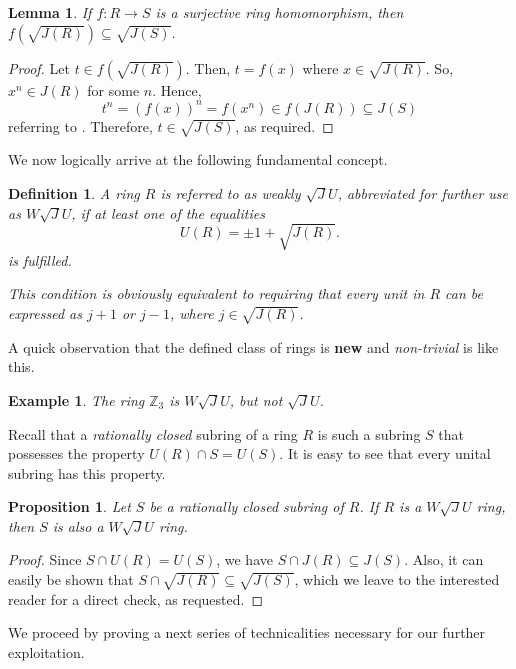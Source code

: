 \documentclass[12pt]{amsart}
\newtheorem{proposition}[theorem]{Proposition} \newtheorem{lemma}[theorem]{Lemma}
\newtheorem{example}[theorem]{Example} \newtheorem{definition}[theorem]{Definition}
\begin{document}
\begin{lemma}\label{2.1} If \(f: R \rightarrow S\) is a surjective ring homomorphism, then $f(\sqrt{J(R)})
\subseteq \sqrt{J(S)}$.
\end{lemma}

\begin{proof} Let $t\in f(\sqrt{J(R)})$. Then, $t=f(x)$ where $x\in \sqrt{J(R)}$. So, $x^n\in J(R)$ for some $n$. Hence, $$t^n=(f(x))^n=f(x^n)\in f(J(R))\subseteq J(S)$$ referring to \cite[Ex.4.10]{lam}. Therefore, $t\in \sqrt{J(S)}$, as required.
\end{proof}

We now logically arrive at the following fundamental concept.

\begin{definition} A ring \( R \) is referred to as {\it weakly $\sqrt{J}U$}, abbreviated for further use as $W\sqrt{J}U$, if at least one of the equalities \[ U(R) = \pm1 + \sqrt{J(R)}. \] is fulfilled.

This condition is obviously equivalent to requiring that every unit in \( R \) can be expressed as \( j + 1 \) or \( j - 1 \), where \( j \in \sqrt{J(R)} \).	
\end{definition}

A quick observation that the defined class of rings is {\bf new} and {\it non-trivial} is like this.

\begin{example} The ring $\mathbb{Z}_3$ is $W\sqrt{J}U$, but {\it not} $\sqrt{J}U$.
\end{example}

Recall that a {\it rationally closed} subring of a ring $R$ is such a subring $S$ that possesses the property $U(R) \cap S = U(S)$. It is easy to see that every unital subring has this property.

\begin{proposition}\label{sub} Let $S$ be a rationally closed subring of $R$. If $R$ is a $W\sqrt{J}U$ ring,
then $S$ is also a $W\sqrt{J}U$ ring.
\end{proposition}

\begin{proof} Since $S \cap U(R) = U(S)$, we have \(S \cap J(R) \subseteq J(S)\). Also, it can easily be shown that \(S \cap \sqrt{J(R)} \subseteq \sqrt{J(S)}\), which we leave to the interested reader for a direct check, as requested.
\end{proof}

We proceed by proving a next series of technicalities necessary for our further exploitation.
\end{document}
